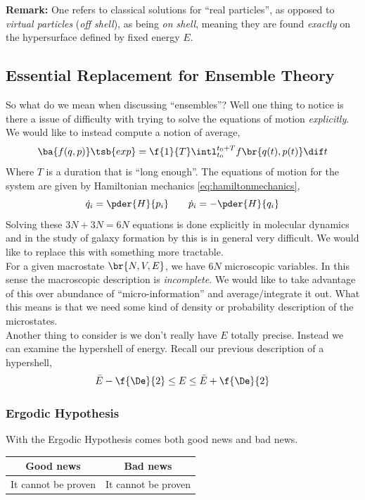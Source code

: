 \documentclass{article}
\begin{document}
\textbf{Remark:} One refers to classical solutions for ``real particles'', as opposed to \textit{virtual particles} (\textit{off shell}), as being \textit{on shell}, meaning they are found \textit{exactly} on the hypersurface defined by fixed energy $E$. \\

\subsection{Essential Replacement for Ensemble Theory}

So what do we mean when discussing ``ensembles''? Well one thing to notice is there a issue of difficulty with trying to solve the equations of motion \textit{explicitly}. We would like to instead compute a notion of average,
\[\ba{f(q,p)}\tsb{exp} = \f{1}{T} \intl_{t_0}^{t_0 + T} f\br{q(t),p(t)} \dif t \]
Where $T$ is a duration that is ``long enough''. The equations of motion for the system are given by Hamiltonian mechanics \eqref{eq:hamiltonmechanics},
\[ \dot{q}_i = \pder{H}{p_i} \qquad \dot{p}_i = -\pder{H}{q_i} \]
Solving these $3N + 3N = 6N$ equations is done explicitly in molecular dynamics and in the study of galaxy formation by this is in general very difficult. We would like to replace this with something more tractable. \\

For a given macrostate $\br{N,V,E}$, we have $6N$ microscopic variables. In this sense the macroscopic description is \textit{incomplete}. We would like to take advantage of this over abundance of ``micro-information'' and average/integrate it out. What this means is that we need some kind of density or probability description of the microstates. \\

Another thing to consider is we don't really have $E$ totally precise. Instead we can examine the hypershell of energy. Recall our previous description of a hypershell,
\[ \bar{E} - \f{\De}{2} \leq E \leq \bar{E} + \f{\De}{2} \]

\subsubsection{Ergodic Hypothesis}
\label{sec:ergodic}
With the Ergodic Hypothesis comes both good news and bad news.

\begin{center}
\begin{tabular}{c|c}
    Good news & Bad news \\
    \hline
    It cannot be proven & It cannot be proven \\
\end{tabular}
\end{center}
\end{document}
